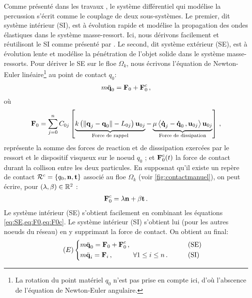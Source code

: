 \noindent Comme présenté dans les travaux \parencite[p.186]{balasoiu2020halthesis}, le système différentiel qui modélise la percussion s’écrit comme le couplage de deux sous-systèmes. Le premier, dit système intérieur (SI), est à évolution rapide et modélise la propagation des ondes élastiques dans le système masse-ressort. Ici, nous dérivons facilement et réutilisont le SI comme présenté par \citeauthor{balasoiu2020halthesis}. Le second, dit système extérieur (SE), est à évolution lente et modélise la pénétration de l’objet solide dans le système masse-ressorts. Pour dériver le SE sur le floe $\Omega_k$, nous écrivons l'équation de Newton-Euler linéaire\footnote{La rotation du point matériel $q_0$ n'est pas prise en compte ici, d'où l'abscence de l'équation de Newton-Euler angulaire.} au point de contact $q_0$:
\begin{align}  \label{eq:SE}
m \ddot{\bm{\mathrm{q}}}_0 = \bm{\mathrm{F}}_0 + \bm{\mathrm{F}}^c_0 \,,
\end{align}
où 
\begin{align}  \label{eq:F0}
    \bm{\mathrm{F}}_0 = \sum_{j=0}^{n}C_{0j} \left[  \underbrace{k \left( \Vert \bm{\mathrm{q}}_j - \bm{\mathrm{q}}_0 \Vert - L_{0j} \right) \bm{\mathrm{u}}_{0j}}_{\text{Force de rappel}} - \underbrace{\mu \left\langle \bm{\mathrm{\dot{q}}}_j - \bm{\mathrm{\dot{q}}}_0\,, \bm{\mathrm{u}}_{0j}  \right\rangle  \bm{\mathrm{u}}_{0j}}_{\text{Force de dissipation}}  \right] \,,
\end{align}
représente la somme des forces de reaction et de disssipation exercées par le ressort et le dispositif visqueux sur le noeud $q_0$ ; et $\bm{\mathrm{F}}^c_0(t)$ la force de contact durant la collison entre les deux particules. En supposnat qu'il existe un repère de contact $\mathcal{R}^c = \{ q_0, \bm{\mathrm{n}}, \bm{\mathrm{t}} \}$ associé au floe $\Omega_k$ (voir \cref{fig:contactmanuel}), on peut écrire, pour $(\lambda, \beta) \in \mathbb{R}^2$ :
\begin{align}  \label{eq:F0c}
    \bm{\mathrm{F}}_0^c = \lambda \bm{\mathrm{n}} + \beta \bm{\mathrm{t}} \,.
\end{align}
Le système intérieur (SE) s'obtient facilement en combinant les équations \cref{eq:SE,eq:F0,eq:F0c}. Le système intérieur (SI) s'obtient lui (pour les autres noeuds du réseau) en y supprimant la force de contact. On obtient au final:
\begin{align} \tag{$E$} \label{eq:e}
\begin{dcases}
    m \ddot{\bm{\mathrm{q}}}_0 = \bm{\mathrm{F}}_0 + \bm{\mathrm{F}}^c_0  \,, &\qquad \text{(SE)} \\
    m \ddot{\bm{\mathrm{q}}}_i = \bm{\mathrm{F}}_i   \,, \quad \quad \quad \forall 1 \leq i \leq n \,. &\qquad \text{(SI)}
\end{dcases}
\end{align}
